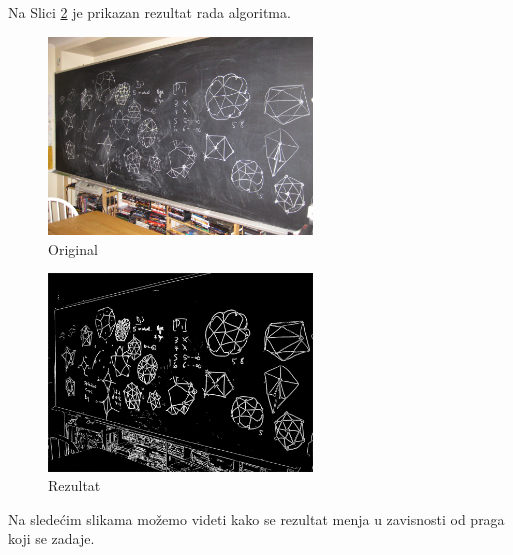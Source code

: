 \documentclass[12pt,a4paper]{article}
\theoremstyle{definition}
\theoremstyle{remark}
\theoremstyle{plain}
\begin{document}
\inputminted[tabsize=2,breaklines]{cpp}{codes/latex/edge_detection.cpp}

Na Slici \ref{fed_result} je prikazan rezultat rada algoritma.

\begin{multicols}{2}
\begin{figure}[H]
\centering
\includegraphics[width=7cm]{images/blackboard.jpg}
  \caption{Original}\label{blackboard_fed_input}
\end{figure}
\columnbreak
\begin{figure}[H]
\centering
\includegraphics[width=7cm]{images/blackboard_35.png}
  \caption{Rezultat}\label{fed_result}
\end{figure}
\end{multicols}

Na slede\' cim slikama mo\v zemo videti kako se rezultat menja u zavisnosti od praga koji se zadaje.
\end{document}
